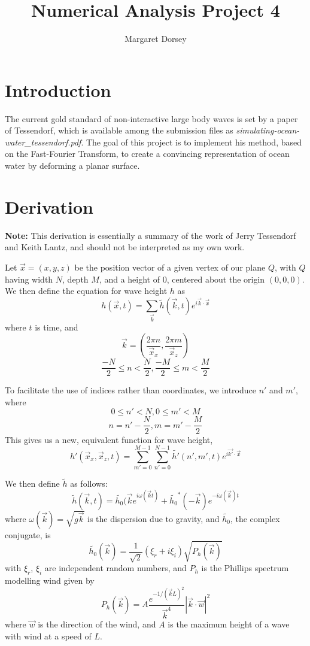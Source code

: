 \documentclass[11pt]{article} %
\title{Numerical Analysis Project 4}
\author{Margaret Dorsey}
\begin{document}
\maketitle

\section*{Introduction}
	The current gold standard of non-interactive large body waves is set by a paper of Tessendorf, which is available among the submission files as 
\textit{simulating-ocean-water\_tessendorf.pdf}. The goal of this project is to implement his method, based on the Fast-Fourier Transform, to create a convincing representation of ocean water by deforming a planar surface.
\section*{Derivation}
\textbf{Note:} This derivation is essentially a summary of the work of Jerry Tessendorf and Keith Lantz, and should not be interpreted as my own work.
\par
Let $\vec{x} = (x,y,z)$ be the position vector of a given vertex of our plane $Q$, with $Q$ having width $N$, depth $M$, and a height of $0$, centered about the origin $(0,0,0)$. We then define the equation for wave height $h$ as
	$$h(\vec{x},t) = \sum_{\vec{k}} \tilde{h}(\vec{k},t) e^{i\vec{k}\cdot \vec{x}}$$
where $t$ is time, and 
	$$\vec{k} = \left( \frac{2\pi n}{\vec{x}_x}, \frac{2\pi m}{\vec{x}_z} \right)$$
	$$ \frac{-N}{2} \leq n < \frac{N}{2} , \frac{-M}{2} \leq m < \frac{M}{2}$$
\par
To facilitate the use of indices rather than coordinates, we introduce $n'$ and $m'$, where 
	$$0 \leq n' < N, 0 \leq m' < M$$
	$$n = n' - \frac{N}{2}, m = m' - \frac{M}{2}$$
This gives us a new, equivalent function for wave height,
	$$ h'(\vec{x}_x,\vec{x}_z,t) = \sum_{m'=0}^{M-1} \sum_{n' = 0} ^{N-1} \tilde{h'}(n',m',t) e^{i\vec{k'} \cdot \vec{x}}$$
\par We then define $\tilde{h}$ as follows:
	$$\tilde{h}(\vec{k},t) = \tilde{h_0}(\vec{k} e^{i \omega(\vec{k}t)} + \tilde{h_0}^*(-\vec{k}) e^{-i \omega(\vec{k})t}$$
where $\omega (\vec{k}) = \sqrt{g\vec{k}}$ is the dispersion due to gravity, and $\tilde{h_0}$, the complex conjugate, is
	$$\tilde{h_0}(\vec{k}) = \frac{1}{\sqrt{2}}(\xi_r + i \xi_i)\sqrt{P_h(\vec{k})}$$
with $\xi_r$, $\xi_i$ are independent random numbers, and $P_h$ is the Phillips spectrum modelling wind given by
	$$P_h(\vec{k}) = A\frac{e^{-1/(\vec{k}L)^2}}{\vec{k}^4} |\vec{k}\cdot \vec{w}|^2$$
where $\vec{w}$ is the direction of the wind, and $A$ is the maximum height of a wave with wind at a speed of $L$.
\end{document}
